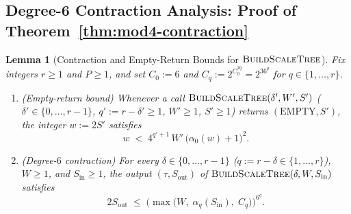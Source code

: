 \documentclass[11pt]{article}
\newtheorem{lemma}[theorem]{Lemma}
\theoremstyle{definition}
\theoremstyle{remark}
\newcommand{\BuildScaleTree}{\textnormal{\scshape BuildScaleTree}}
\begin{document}
\subsection{Degree-6 Contraction Analysis: Proof of Theorem~\ref{thm:mod4-contraction}}
\label{subsec:contraction-proof}

\begin{lemma}[Contraction and Empty-Return Bounds for $\BuildScaleTree$]
\label{lem:build-scale-tree}
Fix integers $r \ge 1$ and $P \ge 1$, and set $C_0 := 6$ and $C_q := 2^{C_0^{2q}} = 2^{36^q}$ for $q \in \{1, \dots, r\}$.
\begin{enumerate}[label=(\arabic*)]
  \item \emph{(Empty-return bound)} Whenever a call $\BuildScaleTree(\delta', W', S')$ ($\delta' \in \{0, \dots, r - 1\}$, $q' := r - \delta' \ge 1$, $W' \ge 1$, $S' \ge 1$) returns $(\mathrm{EMPTY}, S')$, the integer $w := 2 S'$ satisfies
  \[
  w \;<\; 4^{q'+1}\, W'\, \big(\alpha_0(w) + 1\big)^2.
  \]
  \item \emph{(Degree-$6$ contraction)} For every $\delta \in \{0, \dots, r - 1\}$ ($q := r - \delta \in \{1, \dots, r\}$), $W \ge 1$, and $S_{\mathrm{in}} \ge 1$, the output $(\tau, S_{\mathrm{out}})$ of $\BuildScaleTree(\delta, W, S_{\mathrm{in}})$ satisfies
  \[
  2 S_{\mathrm{out}} \;\le\; \Big(\max\big(W,\; \alpha_q(S_{\mathrm{in}}),\; C_q\big)\Big)^{6^q}.
  \]
\end{enumerate}
\end{lemma}
\end{document}
